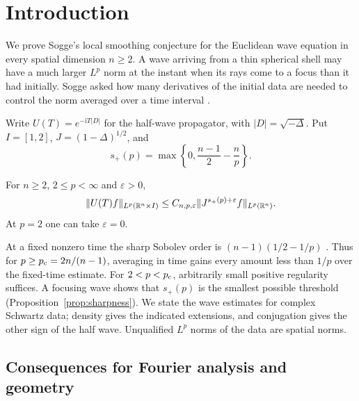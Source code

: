 \section{Introduction}\label{sec:introduction}

We prove Sogge's local smoothing conjecture for the Euclidean wave
equation in every spatial dimension \(n\ge2\). A wave arriving from a
thin spherical shell may have a much larger \(L^p\) norm at the instant
when its rays come to a focus than it had initially. Sogge asked how
many derivatives of the initial data are needed to control the norm
averaged over a time interval \cite[Section~4, Equation~(4.5)]{Sogge1991}.

Write \(U(T)=e^{-\mathrm iT|D|}\) for the half-wave propagator, with
\(|D|=\sqrt{-\Delta}\). Put \(I=[1,2]\), \(J=(1-\Delta)^{1/2}\), and
\[
 s_+(p)=\max\left\{0,\frac{n-1}{2}-\frac np\right\}.
\]

\begin{theorem}\label{thm:local-smoothing}
For \(n\ge2\), \(2\le p<\infty\) and \(\varepsilon>0\),
\begin{equation}\label{eq:sogge}
 \|U(T)f\|_{L^p(\mathbb R^n\times I)}
     \le C_{n,p,\varepsilon}\|J^{s_+(p)+\varepsilon} f\|_{L^p(\mathbb R^n)} .
\end{equation}
At \(p=2\) one can take \(\varepsilon=0\).
\end{theorem}

At a fixed nonzero time the sharp Sobolev order is
\((n-1)(1/2-1/p)\) \cite{Peral1980,Miyachi1980,SSS1991}.
Thus for \(p\ge p_{\mathrm c}=2n/(n-1)\), averaging in time gains every amount
less than \(1/p\) over the fixed-time estimate. For \(2<p<p_{\mathrm c}\),
arbitrarily small positive regularity suffices. A focusing wave shows
that \(s_+(p)\) is the smallest possible threshold
(Proposition~\ref{prop:sharpness}). We state the wave estimates for complex
Schwartz data; density gives the indicated extensions, and conjugation
gives the other sign of the half wave. Unqualified \(L^p\) norms of the
data are spatial norms.

\papercontents

\subsection{Consequences for Fourier analysis and geometry}

